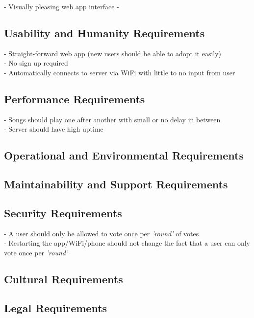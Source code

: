 \documentclass[12pt, titlepage]{article}
\begin{document}
- Visually pleasing web app interface
-

\subsection{Usability and Humanity Requirements}

- Straight-forward web app (new users should be able to adopt it easily) \\
- No sign up required \\
- Automatically connects to server via WiFi with little to no input from user \\

\subsection{Performance Requirements}

- Songs should play one after another with small or no delay in between \\
- Server should have high uptime \\

\subsection{Operational and Environmental Requirements}

\subsection{Maintainability and Support Requirements}

\subsection{Security Requirements}

- A user should only be allowed to vote once per \textit{'round'} of votes \\
- Restarting the app/WiFi/phone should not change the fact that a user can only
  vote once per \textit{'round'} \\

\subsection{Cultural Requirements}

\subsection{Legal Requirements}
\end{document}
